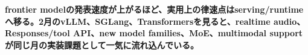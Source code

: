 \noindent\textbf{frontier modelの発表速度が上がるほど、実用上の律速点はserving/runtimeへ移る。2月のvLLM、SGLang、Transformersを見ると、realtime audio、Responses/tool API、new model families、MoE、multimodal supportが同じ月の実装課題として一気に流れ込んでいる。}\autocite{src-5041feb6f87f,src-5bc0746a47c6,src-a43d64987293}

